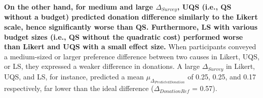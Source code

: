 \textbf{On the other hand, for medium and large $\Delta_{Survey}$, UQS (i.e., QS without a budget) predicted donation difference similarly to the Likert scale, hence significantly worse than QS. Furthermore, LS with various budget sizes (i.e., QS without the quadratic cost) performed worse than Likert and UQS with a small effect size.} When participants conveyed a medium-sized or larger preference difference between two causes in Likert, UQS, or LS, they expressed a weaker difference in donations. A large $\Delta_{Survey}$ in Likert, UQS, and LS, for instance, predicted a mean $\mu_{\Delta_{PredictedDonation}}$ of 0.25, 0.25, and 0.17 respectively, far lower than the ideal difference ($\Delta_{DonationRef}$ = 0.57).


